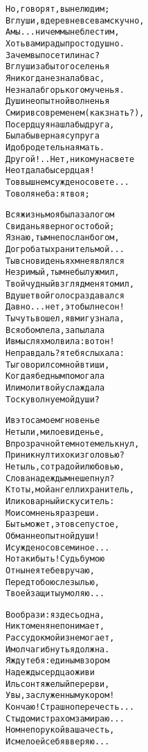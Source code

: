 \begin{minipage}[t]{\dimexpr 0.5\textwidth -\tabcolsep-.5pt}
\begin{alltt}\normalfont\centering
Но, говорят, вы нелюдим;
В глуши, в деревне все вам скучно,
А мы... ничем мы не блестим,
Хоть вам и рады простодушно.
Зачем вы посетили нас?
В глуши забытого селенья
Я никогда не знала б вас,
Не знала б горького мученья.
Души неопытной волненья
Смирив со временем (как знать?),
По сердцу я нашла бы друга,
Была бы верная супруга
И добродетельная мать.
Другой!.. Нет, никому на свете
Не отдала бы сердца я!
То в вышнем суждено совете...
То воля неба: я твоя;
\end{alltt}
\end{minipage}

\begin{minipage}[t]{\dimexpr 0.5\textwidth -\tabcolsep-.5pt}
\begin{alltt}\normalfont\centering
Вся жизнь моя была залогом
Свиданья верного с тобой;
Я знаю, ты мне послан богом,
До гроба ты хранитель мой...
Ты в сновиденьях мне являлся
Незримый, ты мне был уж мил,
Твой чудный взгляд меня томил,
В душе твой голос раздавался
Давно... нет, это был не сон!
Ты чуть вошел, я вмиг узнала,
Вся обомлела, запылала
И в мыслях молвила: вот он!
Не правда ль? я тебя слыхала:
Ты говорил со мной в тиши,
Когда я бедным помогала
Или молитвой услаждала
Тоску волнуемой души?
\end{alltt}
\end{minipage}

\begin{minipage}[t]{\dimexpr 0.5\textwidth -\tabcolsep-.5pt}
\begin{alltt}\normalfont\centering
И в это самое мгновенье
Не ты ли, милое виденье,
В прозрачной темноте мелькнул,
Приникнул тихо к изголовью?
Не ты ль, с отрадой и любовью,
Слова надежды мне шепнул?
Кто ты, мой ангел ли хранитель,
Или коварный искуситель:
Мои сомненья разреши.
Быть может, это все пустое,
Обман неопытной души!
И суждено совсем иное...
Но так и быть! Судьбу мою
Отныне я тебе вручаю,
Перед тобою слезы лью,
Твоей защиты умоляю...
\end{alltt}
\end{minipage}

\begin{minipage}[t]{\dimexpr 0.5\textwidth -\tabcolsep-.5pt}
\begin{alltt}\normalfont\centering
Вообрази: я здесь одна,
Никто меня не понимает,
Рассудок мой изнемогает,
И молча гибнуть я должна.
Я жду тебя: единым взором
Надежды сердца оживи
Иль сон тяжелый перерви,
Увы, заслуженным укором!
Кончаю! Страшно перечесть...
Стыдом и страхом замираю...
Но мне порукой ваша честь,
И смело ей себя вверяю...
\end{alltt}
\end{minipage}

